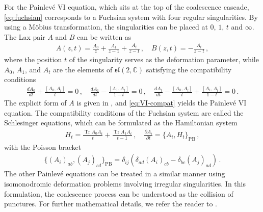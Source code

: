 \documentclass[11pt, a4paper]{article}
\DeclareMathOperator{\Tr}{Tr}
\theoremstyle{definition}
\begin{document}
For the Painlev\'e VI equation, which sits at the top of the coalescence cascade, \eqref{eq:fuchsian} corresponds to a Fuchsian system with four regular singularities. By using a M\"obius transformation, the singularities can be placed at $ 0 $, $ 1 $, $ t $ and $ \infty $. The Lax pair $ A $ and $ B $ can be written as
\begin{align}
    A(z,t) = \frac{A_0}{z} + \frac{A_1}{z-1} + \frac{A_t}{z-t} \, , \quad
    B(z,t) = -\frac{A_t}{z-t} \, ,
\end{align}
where the position $ t $ of the singularity serves as the deformation parameter, while $ A_0 $, $ A_1 $, and $ A_t $ are the elements of $ \mathfrak{sl}(2,\mathbb{C}) $ satisfying the compatibility conditions
\begin{align}\label{eq:VI-compat}
    \frac{d A_0}{dt} + \frac{[A_0,A_t]}{t} = 0 \, , \quad
    \frac{d A_1}{dt} - \frac{[A_1,A_t]}{1-t} = 0 \, , \quad
    \frac{d A_t}{dt} - \frac{[A_0,A_t]}{t} + \frac{[A_1,A_t]}{1-t} = 0 \, .
\end{align}
The explicit form of $ A $ is given in \cite{Jimbo:1981-2}, and \eqref{eq:VI-compat} yields the Painlev\'e VI equation. The compatibility conditions of the Fuchsian system are called the Schlesinger equations, which can be formulated as the Hamiltonian system
\begin{align}\label{eq:PVI-H}
    H_t = \frac{\Tr A_0 A_t}{t} + \frac{\Tr A_1 A_t}{t-1} \, , \quad
    \frac{\partial A_i}{\partial t} = \{ A_i, H_t \}_{\mathrm{PB}} \, ,
\end{align}
with the Poisson bracket
\begin{align}
    \{ (A_i)_{ab}, (A_j)_{cd} \}_{\mathrm{PB}}
    = \delta_{ij} \left( \delta_{ad} (A_i)_{cb} - \delta_{bc} (A_j)_{ad} \right) \, .
\end{align}
The other Painlev\'e equations can be treated in a similar manner using isomonodromic deformation problems involving irregular singularities. In this formulation, the coalescence process can be understood as the collision of punctures. For further mathematical details, we refer the reader to \cite{Jimbo:1981tov, Jimbo:1981-2, Its:2018}.
\end{document}
